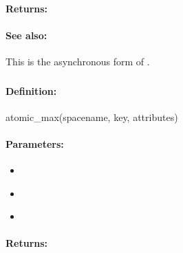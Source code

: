 \paragraph{Returns:}


\paragraph{See also:}  This is the asynchronous form of .

\pagebreak
\subsubsection{}
\label{api:ruby:atomic_max}


\paragraph{Definition:}
\begin{rubycode}
atomic_max(spacename, key, attributes)
\end{rubycode}

\paragraph{Parameters:}
\begin{itemize}[noitemsep]
\item {}\\

\item {}\\

\item {}\\

\end{itemize}

\paragraph{Returns:}


\pagebreak
\subsubsection{}
\label{api:ruby:async_atomic_max}


